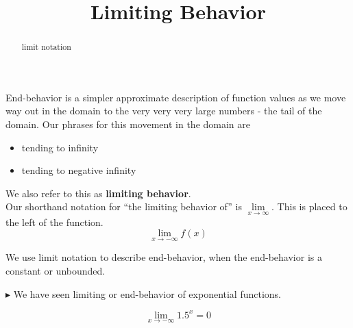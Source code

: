 \documentclass{ximera}
\title{Limiting Behavior}
\begin{document}
\begin{abstract}
limit notation
\end{abstract}
\maketitle




End-behavior is a simpler approximate description of function values as we move way out in the domain to the very very very large numbers - the tail of the domain.  Our phrases for this movement in the domain are 

\begin{itemize}
\item tending to infinity
\item tending to negative infinity
\end{itemize}


We also refer to this as \textbf{limiting behavior}. \\


Our shorthand notation for ``the limiting behavior of'' is $\lim\limits_{x \to \infty}$.  This is placed to the left of the function. \\


\[   \lim_{x \to -\infty} f(x)     \]



We use limit notation to describe end-behavior, when the end-behavior is a constant or unbounded.






$\blacktriangleright$  We have seen limiting or end-behavior of exponential functions.


\[   \lim_{x \to -\infty} 1.5^x   = 0      \]


\begin{image}
\end{image}
\end{document}

